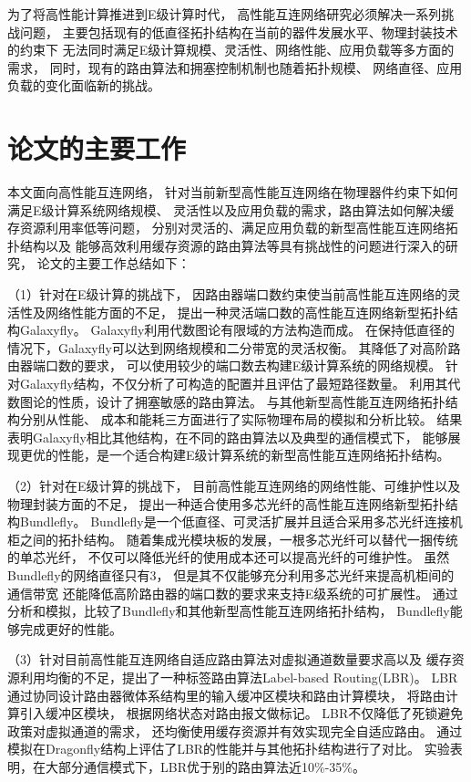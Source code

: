 为了将高性能计算推进到E级计算时代，
高性能互连网络研究必须解决一系列挑战问题，
主要包括现有的低直径拓扑结构在当前的器件发展水平、物理封装技术的约束下
无法同时满足E级计算规模、灵活性、网络性能、应用负载等多方面的需求，
同时，现有的路由算法和拥塞控制机制也随着拓扑规模、
网络直径、应用负载的变化面临新的挑战。


\section{论文的主要工作}
本文面向高性能互连网络，
针对当前新型高性能互连网络在物理器件约束下如何满足E级计算系统网络规模、
灵活性以及应用负载的需求，路由算法如何解决缓存资源利用率低等问题，
分别对灵活的、满足应用负载的新型高性能互连网络拓扑结构以及
能够高效利用缓存资源的路由算法等具有挑战性的问题进行深入的研究，
论文的主要工作总结如下：

（1）针对在E级计算的挑战下，
因路由器端口数约束使当前高性能互连网络的灵活性及网络性能方面的不足，
提出一种灵活端口数的高性能互连网络新型拓扑结构Galaxyfly。
Galaxyfly利用代数图论有限域的方法构造而成。
在保持低直径的情况下，Galaxyfly可以达到网络规模和二分带宽的灵活权衡。
其降低了对高阶路由器端口数的要求，
可以使用较少的端口数去构建E级计算系统的网络规模。
针对Galaxyfly结构，不仅分析了可构造的配置并且评估了最短路径数量。
利用其代数图论的性质，设计了拥塞敏感的路由算法。
与其他新型高性能互连网络拓扑结构分别从性能、
成本和能耗三方面进行了实际物理布局的模拟和分析比较。
结果表明Galaxyfly相比其他结构，在不同的路由算法以及典型的通信模式下，
能够展现更优的性能，是一个适合构建E级计算系统的新型高性能互连网络拓扑结构。

（2）针对在E级计算的挑战下，
目前高性能互连网络的网络性能、可维护性以及物理封装方面的不足，
提出一种适合使用多芯光纤的高性能互连网络新型拓扑结构Bundlefly。
Bundlefly是一个低直径、可灵活扩展并且适合采用多芯光纤连接机柜之间的拓扑结构。
随着集成光模块板的发展，一根多芯光纤可以替代一捆传统的单芯光纤，
不仅可以降低光纤的使用成本还可以提高光纤的可维护性。
虽然Bundlefly的网络直径只有3，
但是其不仅能够充分利用多芯光纤来提高机柜间的通信带宽
还能降低高阶路由器的端口数的要求来支持E级系统的可扩展性。
通过分析和模拟，比较了Bundlefly和其他新型高性能互连网络拓扑结构，
Bundlefly能够完成更好的性能。

（3）针对目前高性能互连网络自适应路由算法对虚拟通道数量要求高以及
缓存资源利用均衡的不足，提出了一种标签路由算法Label-based Routing(LBR)。
LBR通过协同设计路由器微体系结构里的输入缓冲区模块和路由计算模块，
将路由计算引入缓冲区模块，
根据网络状态对路由报文做标记。
LBR不仅降低了死锁避免政策对虚拟通道的需求，
还均衡使用缓存资源并有效实现完全自适应路由。
通过模拟在Dragonfly结构上评估了LBR的性能并与其他拓扑结构进行了对比。
实验表明，在大部分通信模式下，LBR优于别的路由算法近10\%-35\%。

